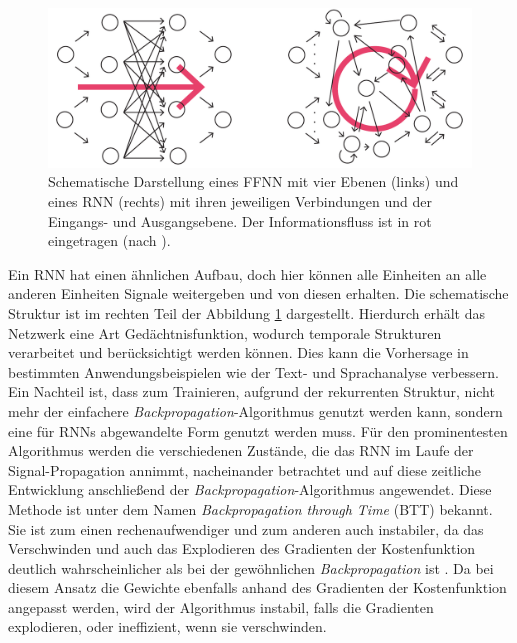 \begin{figure}[H]
    \centering
    \includegraphics[width = 0.9 \textwidth]{figures/illustrations/ffnn_rnn_structure.pdf}
    \caption{Schematische Darstellung eines \textsc{FFNN} mit vier Ebenen (links) und eines \textsc{RNN} (rechts) mit ihren jeweiligen Verbindungen und der Eingangs- und Ausgangsebene. Der Informationsfluss ist in rot eingetragen (nach \citep{jeagerTut2002}).}
    \label{fig:ffnn_rnn_structure}
\end{figure}

Ein \textsc{RNN} hat einen ähnlichen Aufbau, doch hier können alle Einheiten an alle anderen Einheiten Signale weitergeben und von diesen erhalten. Die schematische Struktur ist im rechten Teil der Abbildung \ref{fig:ffnn_rnn_structure} dargestellt. Hierdurch erhält das Netzwerk eine Art Gedächtnisfunktion, wodurch temporale Strukturen verarbeitet und berücksichtigt werden können. Dies kann die Vorhersage in bestimmten Anwendungsbeispielen wie der Text- und Sprachanalyse verbessern.\\
Ein Nachteil ist, dass zum Trainieren, aufgrund der rekurrenten Struktur, nicht mehr der einfachere \textit{Backpropagation}-Algorithmus genutzt werden kann, sondern eine für \textsc{RNN}s abgewandelte Form genutzt werden muss. Für den prominentesten Algorithmus werden die verschiedenen Zustände, die das \textsc{RNN} im Laufe der Signal-Propagation annimmt, nacheinander betrachtet und auf diese zeitliche Entwicklung anschließend der \textit{Backpropagation}-Algorithmus angewendet. Diese Methode ist unter dem Namen \textit{Backpropagation through Time} (BTT) bekannt. Sie ist zum einen rechenaufwendiger und zum anderen auch instabiler, da das Verschwinden und auch das Explodieren des Gradienten der Kostenfunktion deutlich wahrscheinlicher als bei der gewöhnlichen \textit{Backpropagation} ist \citep{pascanu, jeagerTut2002}. Da bei diesem Ansatz die Gewichte ebenfalls anhand des Gradienten der Kostenfunktion angepasst werden, wird der Algorithmus instabil, falls die Gradienten explodieren, oder ineffizient, wenn sie verschwinden.
